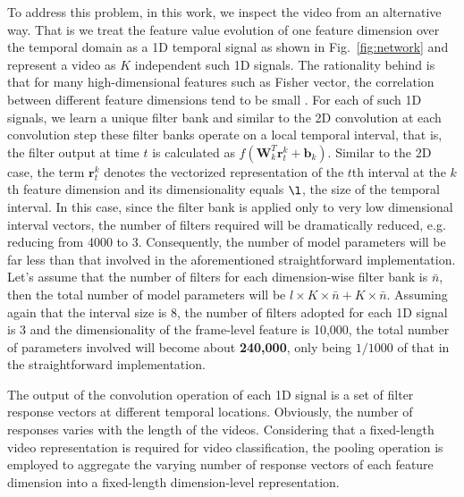 \documentclass[journal]{IEEEtran}
\begin{document}
To address this problem, in this work, we inspect the video from an alternative way. That is we treat the feature value evolution of one feature dimension over the temporal domain as a 1D temporal signal as shown in Fig.~\ref{fig:network} and represent a video as $K$ independent such 1D signals. The rationality behind is that for many high-dimensional features such as Fisher vector, the correlation between different feature dimensions tend to be small \cite{Zhang_2014_CVPR}. For each of such 1D signals, we learn a unique filter bank and similar to the 2D convolution at each convolution step these filter banks operate on a local temporal interval, that is, the filter output at time $t$ is calculated as $f(\mathbf{W}_{k}^T \mathbf{r}^{k}_{t}+\mathbf{b}_k)$. Similar to the 2D case, the term $\mathbf{r}^{k}_{t}$ denotes the vectorized representation of the $t$th interval at the $k$th feature dimension and its dimensionality equals $\l$, the size of the temporal interval.
%
In this case, since the filter bank is applied only to very low dimensional interval vectors, the number of filters required will be dramatically reduced,  e.g. reducing from 4000 to 3. Consequently, the number of model parameters will be far less than that involved in the aforementioned straightforward implementation. Let's assume that the number of filters for each dimension-wise filter bank is $\bar{n}$, then the total number of model parameters will be $l \times K \times \bar{n} +  K \times \bar{n}$. Assuming again that the interval size is 8, the number of filters adopted for each 1D signal is 3 and the dimensionality of the frame-level feature is 10,000, the total number of parameters involved will become about \textbf{240,000}, only being $1/1000$ of that in the straightforward implementation.


%

%


%

%
%
%
%

%


The output of the convolution operation of each 1D signal is a set of filter response vectors at different temporal locations. Obviously, the number of responses varies with the length of the videos. Considering that a fixed-length video representation is required for video classification, the pooling operation is employed to aggregate the varying number of response vectors of each feature dimension into a fixed-length dimension-level representation.
\end{document}
